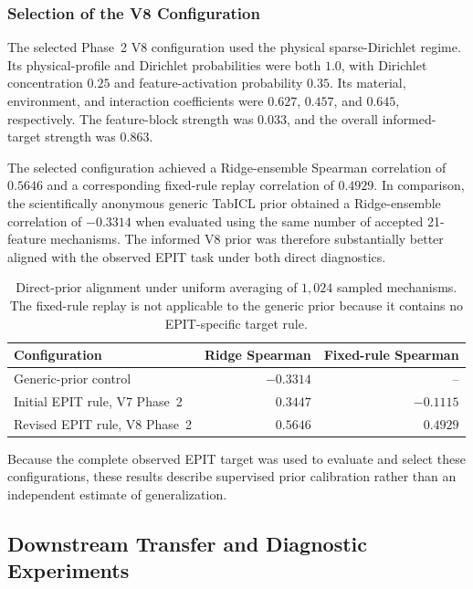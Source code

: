 \documentclass{article}
\begin{document}
\subsubsection{Selection of the V8 Configuration}

The selected Phase~2 V8 configuration used the physical sparse-Dirichlet regime. Its physical-profile and Dirichlet probabilities were both \(1.0\), with Dirichlet concentration \(0.25\) and feature-activation probability \(0.35\). Its material, environment, and interaction coefficients were \(0.627\), \(0.457\), and \(0.645\), respectively. The feature-block strength was \(0.033\), and the overall informed-target strength was \(0.863\).

The selected configuration achieved a Ridge-ensemble Spearman correlation of \(0.5646\) and a corresponding fixed-rule replay correlation of \(0.4929\). In comparison, the scientifically anonymous generic TabICL prior obtained a Ridge-ensemble correlation of \(-0.3314\) when evaluated using the same number of accepted 21-feature mechanisms. The informed V8 prior was therefore substantially better aligned with the observed EPIT task under both direct diagnostics.

\begin{table}[htbp]
\centering
\caption{Direct-prior alignment under uniform averaging of \(1{,}024\) sampled mechanisms. The fixed-rule replay is not applicable to the generic prior because it contains no EPIT-specific target rule.}
\label{tab:direct-prior-results}
\begin{tabular}{lrr}
\hline
Configuration & Ridge Spearman & Fixed-rule Spearman \\
\hline
Generic-prior control & \(-0.3314\) & -- \\
Initial EPIT rule, V7 Phase~2 & \(0.3447\) & \(-0.1115\) \\
Revised EPIT rule, V8 Phase~2 & \(\mathbf{0.5646}\) & \(\mathbf{0.4929}\) \\
\hline
\end{tabular}
\end{table}

Because the complete observed EPIT target was used to evaluate and select these configurations, these results describe supervised prior calibration rather than an independent estimate of generalization.


\subsection{Downstream Transfer and Diagnostic Experiments}
\label{sec:results-direct-prior-transfer}
\end{document}
